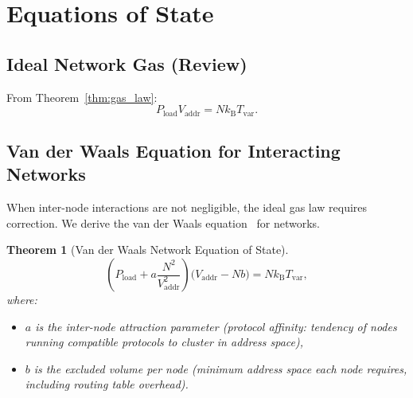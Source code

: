 \documentclass[11pt,twocolumn,a4paper]{article}
\newtheorem{theorem}{Theorem}[section]
\theoremstyle{definition}
\theoremstyle{remark}
\newcommand{\kB}{k_{\mathrm{B}}}
\newcommand{\Tvar}{T_{\mathrm{var}}}
\newcommand{\Pload}{P_{\mathrm{load}}}
\newcommand{\Vaddr}{V_{\mathrm{addr}}}
\begin{document}
\section{Equations of State}\label{sec:eos}

\subsection{Ideal Network Gas (Review)}\label{sec:eos_ideal}

From Theorem~\ref{thm:gas_law}:
\begin{equation}\label{eq:eos_ideal}
  \Pload\Vaddr = N\kB\Tvar.
\end{equation}

\subsection{Van der Waals Equation for Interacting Networks}\label{sec:vdw}

When inter-node interactions are not negligible, the ideal gas law requires
correction.  We derive the van der Waals equation~\cite{vanderWaals1873}
for networks.

\begin{theorem}[Van der Waals Network Equation of State]\label{thm:vdw}
\begin{equation}\label{eq:vdw}
  \left(\Pload + a\frac{N^2}{\Vaddr^2}\right)
  \bigl(\Vaddr - Nb\bigr) = N\kB\Tvar,
\end{equation}
where:
\begin{itemize}
  \item $a$ is the \emph{inter-node attraction parameter} (protocol affinity:
        tendency of nodes running compatible protocols to cluster in address
        space),
  \item $b$ is the \emph{excluded volume per node} (minimum address space
        each node requires, including routing table overhead).
\end{itemize}
\end{theorem}
\end{document}
